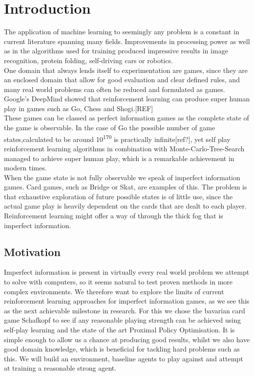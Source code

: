 \chapter{Introduction}
The application of machine learning to seemingly any problem is a constant in current literature spanning many
fields.
Improvements in processing power as well as in the algorithms used for training produced impressive results in image
recognition, protein folding, self-driving cars or robotics.\\
One domain that always lends itself to experimentation are games, since they are an enclosed domain that allow for
good evaluation and clear defined rules, and many real world problems can often be reduced and formulated as games.
\newline
Google's DeepMind showed that reinforcement learning can produce super human play in games such as Go, Chess and
Shogi.[REF]\\
These games can be classed as perfect information games as the complete state of the game is observable.
In the case of Go the possible number of game states,calculated to be around 10\textsuperscript{170} is practically
infinite[ref?], yet self play reinforcement learning algorithms in combination with Monte-Carlo-Tree-Search managed
to achieve super human play, which is a remarkable achievement in
modern times.\\
When the game state is not fully observable we speak of imperfect information games.
Card games, such as Bridge or Skat, are examples of this.
The problem is that exhaustive exploration of future possible states is of little use, since the actual game play is
heavily dependent on the cards that are dealt to each player.\\
Reinforcement learning might offer a way of through the thick fog that is imperfect information.


\section{Motivation}
Imperfect information is present in virtually every real world problem we attempt to solve with computers, so it
seems natural to test proven methods in more complex environments.
We therefore want to explore the limits of current reinforcement learning approaches for imperfect information games, as
we see this as the next achievable milestone in research.
For this we chose the bavarian card game Schafkopf to see if any reasonable playing strength can be achieved using
self-play learning and the state of the art Proximal Policy Optimisation.
It is simple enough to allow us a chance at producing good results, whilst we also have good domain knowledge, which
is beneficial for tackling hard problems such as this.
We will build an environment, baseline agents to play against and attempt at training a reasonable strong agent.


